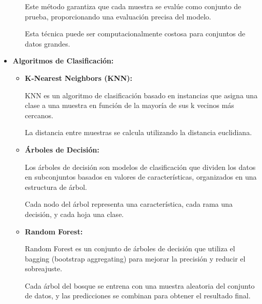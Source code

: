 \begin{itemize}
\begin{itemize}
	Este método garantiza que cada muestra se evalúe como conjunto de prueba, proporcionando una evaluación precisa del modelo.
	
	Esta técnica puede ser computacionalmente costosa para conjuntos de datos grandes.
		
	\end{itemize}
	
	
\item
\textbf{Algoritmos de Clasificación:}	
	
	\begin{itemize}
	
	\item
	\textbf{K-Nearest Neighbors (KNN):}
	
	KNN es un algoritmo de clasificación basado en instancias que asigna una clase a una muestra en función de la mayoría de sus k vecinos más cercanos.
	
	La distancia entre muestras se calcula utilizando la distancia euclidiana.
	
	
	

	\item
	\textbf{Árboles de Decisión:}	
	
	Los árboles de decisión son modelos de clasificación que dividen los datos en subconjuntos basados en valores de características, organizados en una estructura de árbol.
	
	Cada nodo del árbol representa una característica, cada rama una decisión, y cada hoja una clase.
	

	
	

	\item
	\textbf{Random Forest:}	
	
	Random Forest es un conjunto de árboles de decisión que utiliza el bagging (bootstrap aggregating) para mejorar la precisión y reducir el sobreajuste.
	
	Cada árbol del bosque se entrena con una muestra aleatoria del conjunto de datos, y las predicciones se combinan para obtener el resultado final.
	
	

	\end{itemize}
\end{itemize}
	

